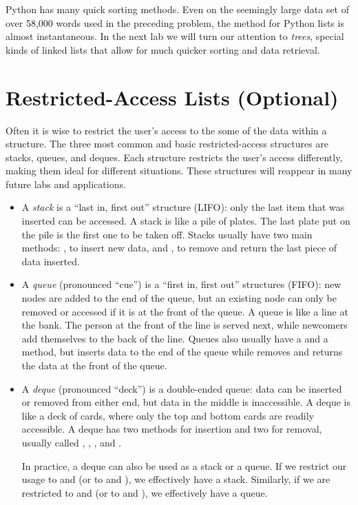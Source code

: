 Python has many quick sorting methods.
Even on the seemingly large data set of over 58,000 words used in the preceding problem, the  method for Python lists is almost instantaneous.
In the next lab we will turn our attention to \emph{trees}, special kinds of linked lists that allow for much quicker sorting and data retrieval.

\section*{Restricted-Access Lists (Optional)}
Often it is wise to restrict the user's access to the some of the data within a structure.
The three most common and basic restricted-access structures are stacks, queues, and deques.
Each structure restricts the user's access differently, making them ideal for different situations.
These structures will reappear in many future labs and applications.

\begin{itemize}
\item A \emph{stack} is a ``last in, first out'' structure (LIFO): only the last item that was inserted can be accessed.
A stack is like a pile of plates.
The last plate put on the pile is the first one to be taken off.
Stacks usually have two main methods: , to insert new data, and , to remove and return the last piece of data inserted.

\item A \emph{queue} (pronounced ``cue'') is a ``first in, first out'' structures (FIFO): new nodes are added to the end of the queue, but an existing node can only be removed or accessed if it is at the front of the queue.
A queue is like a line at the bank.
The person at the front of the line is served next, while newcomers add themselves to the back of the line.
Queues also usually have a  and a  method, but  inserts data to the end of the queue while  removes and returns the data at the front of the queue.

\item A \emph{deque} (pronounced ``deck'') is a double-ended queue: data can be inserted or removed from either end, but data in the middle is inaccessible.
A deque is like a deck of cards, where only the top and bottom cards are readily accessible.
A deque has two methods for insertion and two for removal, usually called , , , and .

In practice, a deque can also be used as a stack or a queue.
If we restrict our usage to  and  (or to  and ), we effectively have a stack.
Similarly, if we are restricted to  and  (or to  and ), we effectively have a queue.
\end{itemize}

